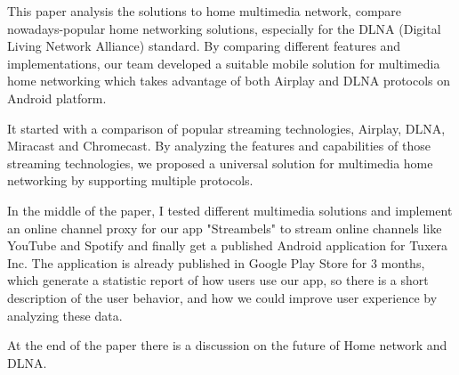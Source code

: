 
 This paper analysis the solutions to home multimedia network, compare 
 nowadays-popular home networking solutions, especially for the DLNA 
 (Digital Living Network Alliance) standard. By comparing different 
 features and implementations, our team developed a suitable mobile 
 solution for multimedia home networking which takes advantage of both 
 Airplay and DLNA protocols on Android platform.

 It started with a comparison of popular streaming technologies, Airplay, 
 DLNA, Miracast and Chromecast. By analyzing the features and capabilities 
 of those streaming technologies, we proposed a universal solution for 
 multimedia home networking by supporting multiple protocols.

 In the middle of the paper, I tested different multimedia solutions and 
 implement an online channel proxy for our app "Streambels" to stream online 
 channels like YouTube and Spotify and finally get a published Android 
 application for Tuxera Inc. The application is already published in Google 
 Play Store for 3 months, which generate a statistic report of how users use 
 our app, so there is a short description of the user behavior, and how we 
 could improve user experience by analyzing these data.

 At the end of the paper there is a discussion on the future of Home 
 network and DLNA.
